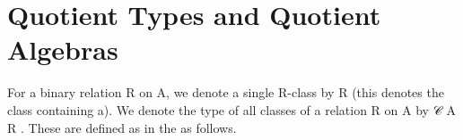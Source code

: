 \documentclass[a4paper,UKenglish,cleveref,autoref,thm-restate]{lipics-v2021}
\begin{document}
\section{Quotient Types and Quotient Algebras}\label{sec:quotient-types-and-quotient-algebras}
For a binary relation \ab R on \ab A, we denote a single \ab R-class by \af [ \ab a \af ] \ab R (this denotes the class containing \ab a). We denote the type of all classes of a relation \ab R on \ab A by \af 𝒞 \as{\{} \ab A \as{\}} \as{\{} \ab R \as{\}}.  These are defined as in the \ualib as follows.
\ccpad
\begin{code}%
\>[1]\AgdaOperator{\AgdaFunction{[\AgdaUnderscore{}]}}\AgdaSpace{}%
\AgdaSymbol{:}\AgdaSpace{}%
\AgdaSymbol{\{}\AgdaSpace{}%
\AgdaSymbol{:}\AgdaSpace{}%
\AgdaSpace{}%
\AgdaSpace{}%
\AgdaSymbol{\}}\AgdaSpace{}%
\AgdaSpace{}%
\AgdaSpace{}%
\AgdaSpace{}%
\AgdaSpace{}%
\AgdaSpace{}%
\AgdaSpace{}%
\AgdaSpace{}%
\AgdaSpace{}%
\AgdaSpace{}%
\<%
\\
%
\>[1]\AgdaOperator{\AgdaFunction{[}}\AgdaSpace{}%
\AgdaSpace{}%
\AgdaOperator{\AgdaFunction{]}}\AgdaSpace{}%
\AgdaSpace{}%
\AgdaSymbol{=}\AgdaSpace{}%
\AgdaSpace{}%
\AgdaSpace{}%
\AgdaSpace{}%
\AgdaSpace{}%
\AgdaSpace{}%
\<%
\\
\\
\>[1]\AgdaSpace{}%
\AgdaSymbol{:}\AgdaSpace{}%
\AgdaSymbol{\{}\AgdaSpace{}%
\AgdaSymbol{:}\AgdaSpace{}%
\AgdaSpace{}%
\AgdaSymbol{\}\{}\AgdaSpace{}%
\AgdaSymbol{:}\AgdaSpace{}%
\AgdaSpace{}%
\AgdaSpace{}%
\AgdaSymbol{\}}\AgdaSpace{}%
\AgdaSpace{}%
\AgdaSpace{}%
\AgdaSpace{}%
\AgdaSpace{}%
\AgdaSpace{}%
\AgdaSymbol{(}\AgdaSpace{}%
\AgdaSpace{}%
\AgdaSpace{}%
\AgdaSymbol{)}\AgdaSpace{}%
\<%
\\
%
\>[1]\AgdaSpace{}%
\AgdaSymbol{\{}\AgdaSymbol{\}\{}\AgdaSymbol{\}}\AgdaSpace{}%
\AgdaSymbol{=}\AgdaSpace{}%
\AgdaSpace{}%
\AgdaSymbol{(}\AgdaSpace{}%
\AgdaSymbol{:}\AgdaSpace{}%
\AgdaSpace{}%
\AgdaSpace{}%
\AgdaSymbol{)}\AgdaSpace{}%
\AgdaSpace{}%
\AgdaSpace{}%
\AgdaSpace{}%
\AgdaSpace{}%
\AgdaSpace{}%
\AgdaFunction{,}\AgdaSpace{}%
\AgdaSpace{}%
\AgdaSpace{}%
\AgdaSymbol{(}\AgdaSpace{}%
\AgdaOperator{\AgdaFunction{[}}\AgdaSpace{}%
\AgdaSpace{}%
\AgdaOperator{\AgdaFunction{]}}\AgdaSpace{}%
\AgdaSymbol{)}\<%
\end{code}
\end{document}
